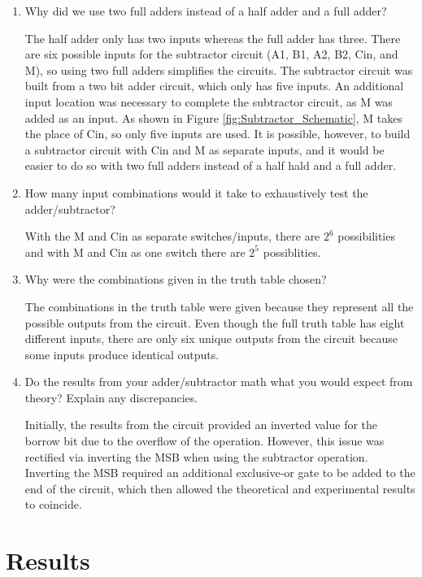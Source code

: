 \documentclass[11pt]{article}
\begin{document}
\begin{enumerate}
	\item Why did we use two full adders instead of a half adder and a full adder?

  The half adder only has two inputs whereas the full adder has three. There are six possible inputs for the subtractor circuit (A1, B1, A2, B2, Cin, and M), so using two full adders simplifies the circuits. The subtractor circuit was built from a two bit adder circuit, which only has five inputs. An additional input location was necessary to complete the subtractor circuit, as M was added as an input. As shown in Figure \ref{fig:Subtractor_Schematic}, M takes the place of Cin, so only five inputs are used. It is possible, however, to build a subtractor circuit with Cin and M as separate inputs, and it would be easier to do so with two full adders instead of a half hald and a full adder. 
	
	\item How many input combinations would it take to exhaustively test the adder/subtractor?

With the M and Cin as separate switches/inputs, there are $2^6$ possibilities and with M and Cin as one switch there are $2^5$ possiblities.

	\item Why were the combinations given in the truth table chosen?

The combinations in the truth table were given because they represent all the possible outputs from the circuit. Even though the full truth table has eight different inputs, there are only six unique outputs from the circuit because some inputs produce identical outputs.

    \item Do the results from your adder/subtractor math what you would expect from theory? Explain any discrepancies.
    
Initially, the results from the circuit provided an inverted value for the borrow bit due to the overflow of the operation. However, this issue was rectified via inverting the MSB when using the subtractor operation. Inverting the MSB required an additional exclusive-or gate to be added to the end of the circuit, which then allowed the theoretical and experimental results to coincide.
   
\end{enumerate}

\section*{Results}
\end{document}
